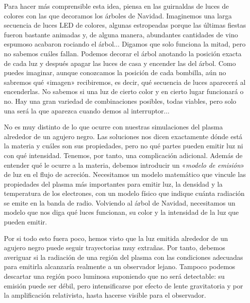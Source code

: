 Para hacer más comprensible esta idea, piensa en las guirnaldas de luces de colores con las que decoramos los árboles de Navidad. Imaginemos una larga secuencia de luces LED de colores, algunas estropeadas porque las últimas fiestas fueron bastante animadas y, de alguna manera, abundantes cantidades de vino espumoso acabaron rociando el árbol... Digamos que solo funciona la mitad, pero no sabemos cuáles fallan. Podemos decorar el árbol anotando la posición exacta de cada luz y después apagar las luces de casa y encender las del árbol. Como puedes imaginar, aunque conozcamos la posición de cada bombilla, aún no sabremos qué «imagen» recibiremos, es decir, qué secuencia de luces aparecerá al encenderlas. No sabemos si una luz de cierto color y en cierto lugar funcionará o no. Hay una gran variedad de combinaciones posibles, todas viables, pero solo una será la que aparezca cuando demos al interruptor...

No es muy distinto de lo que ocurre con nuestras simulaciones del plasma alrededor de un agujero negro. Las soluciones nos dicen exactamente dónde está la materia y cuáles son sus propiedades, pero no qué partes pueden emitir luz ni con qué intensidad. Tenemos, por tanto, una complicación adicional. Además de entender qué le ocurre a la materia, debemos introducir un «\emph{modelo de emisión}» de luz en el flujo de acreción. Necesitamos un modelo matemático que vincule las propiedades del plasma más importantes para emitir luz, la densidad y la temperatura de los electrones, con un modelo físico que indique cuánta radiación se emite en la banda de radio. Volviendo al árbol de Navidad, necesitamos un modelo que nos diga qué luces funcionan, su color y la intensidad de la luz que pueden emitir.

Por si todo esto fuera poco, hemos visto que la luz emitida alrededor de un agujero negro puede seguir trayectorias muy extrañas. Por tanto, debemos averiguar si la radiación de una región del plasma con las condiciones adecuadas para emitirla alcanzaría realmente a un observador lejano. Tampoco podemos descartar una región poco luminosa suponiendo que no será detectable: su emisión puede ser débil, pero intensificarse por efecto de lente gravitatoria y por la amplificación relativista, hasta hacerse visible para el observador.

